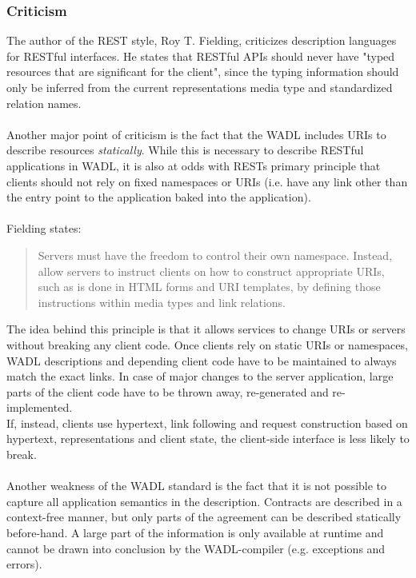 \subsubsection{Criticism}
The author of the REST style, Roy T. Fielding, criticizes description languages for RESTful interfaces. He states that RESTful APIs should never have "typed resources that are significant for the client", since the typing information should only be inferred from the current representations media type and standardized relation names.  \cite{FIELDBLOG}
\\ \\
Another major point of criticism is the fact that the WADL includes URIs to describe resources \emph{statically}. While this is necessary to describe RESTful applications in WADL, it is also at odds with RESTs primary principle that clients should not rely on fixed namespaces or URIs (i.e. have any link other than the entry point to the application baked into the application).
\\ \\
Fielding states:
\begin{quote}
Servers must have the freedom to control their own namespace. Instead, allow servers to instruct clients on how to construct appropriate URIs, such as is done in HTML forms and URI templates, by defining those instructions within media types and link relations. \cite{FIELDBLOG}
\end{quote}
The idea behind this principle is that it allows services to change URIs or servers without breaking any client code. Once clients rely on static URIs or namespaces, WADL descriptions and depending client code have to be maintained to always match the exact links. In case of major changes to the server application, large parts of the client code have to be thrown away, re-generated and re-implemented.
\\
If, instead, clients use hypertext, link following and request construction based on hypertext, representations and client state, the client-side interface is less likely to break. \cite{GREGBLOG}
\\ \\
Another weakness of the WADL standard is the fact that it is not possible to capture all application semantics in the description. Contracts are described in a context-free manner, but only parts of the agreement can be described statically before-hand. A large part of the information is only available at runtime and cannot be drawn into conclusion by the WADL-compiler (e.g. exceptions and errors).